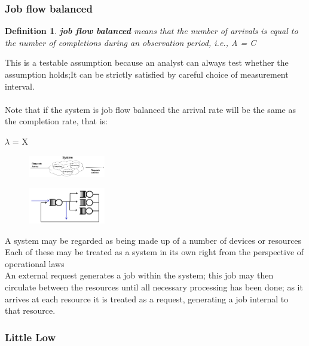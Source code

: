 \documentclass[10pt, oneside]{article}
\newtheorem{defn}{Definition}
\begin{document}
\subsubsection{Job flow balanced}
\begin{defn}
        {\bf job flow balanced} means that the number of arrivals is equal to the number of completions during an observation period, i.e., A = C
\end{defn}This is a testable assumption because an analyst can always test whether the assumption holds;It can be strictly satisfied by careful choice of measurement interval.\\\\Note that if the system is job flow balanced the arrival rate will be the same as the completion rate, that is: \begin{center}
    $\lambda$ = X
\end{center}\begin{multicols}{2}
    \begin{figure}[H]
        \begin{center}
            \includegraphics[width=0.3\textwidth]{img/img111.png}
            \end{center}
\end{figure}\columnbreak
\begin{figure}[H]
    \begin{center}
        \includegraphics[width=0.3\textwidth]{img/img112.png}
        \end{center}
\end{figure}
\end{multicols}
A system may be regarded as being made up of a number of devices or resources\\Each of these may be treated as a system in its own right from the perspective of operational laws\\An external request generates a job within the system; this job may then circulate between the resources until all necessary processing has been done; as it arrives at each resource it is treated as a request, generating a job internal to that resource.\subsubsection{Little Low}
\end{document}
